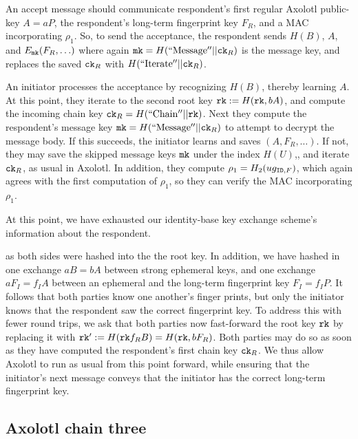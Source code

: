 \documentclass[twoside,letterpaper]{sig-alternate}
\begin{document}
An accept message should communicate 
 respondent's first regular Axolotl public-key $A = a P$,
 the respondent's long-term fingerprint key $F_R$, and
 a MAC incorporating $\rho_1$.
So, to send the acceptance, the respondent
sends $H(B)$, $A$, and $E_{\mathtt{mk}}(F_R,\ldots)$ where again
 $\mathtt{mk} = H(\mathrm{``Message''}  || \mathtt{ck}_R)$ is the message key,
and replaces the saved $\mathtt{ck}_R$ with $H(\mathrm{``Iterate''} || \mathtt{ck}_R)$.

\smallskip

An initiator processes the acceptance by recognizing $H(B)$,
 thereby learning $A$.
At this point, they iterate to the second root key
 $\mathtt{rk} := H(\mathtt{rk}, b A )$, and
compute the incoming chain key $\mathtt{ck}_R = H(\mathrm{``Chain''} || \mathtt{rk})$.
Next they compute the respondent's
 message key $\mathtt{mk} = H(\mathrm{``Message''}  || \mathtt{ck}_R)$
to attempt to decrypt the message body.
If this succeeds, the initiator learns and saves $(A,F_R,\ldots)$.
If not, they may save the skipped message keys $\mathtt{mk}$ under the index $H(U)$,,
and iterate $\mathtt{ck}_R$, as usual in Axolotl.
In addition, they compute $\rho_1 = H_2( u g_{\mathtt{ID},F} )$,
 which again agrees with the first computation of $\rho_1$,
so they can verify the MAC  incorporating $\rho_1$.

\smallskip







At this point, we have exhausted our identity-base key exchange scheme's
information about the respondent.  

 as both sides were hashed into the the root key.  In addition, we have
hashed in one exchange $a B = b A$ between strong ephemeral keys, and
one exchange $a F_I = f_I A$ between an ephemeral and
 the long-term fingerprint key $F_I = f_I P$.
It follows that both parties know one another's finger prints, but only
the initiator knows that the respondent saw the correct fingerprint key.
To address this with fewer round trips, we ask that both parties
now fast-forward the root key $\mathtt{rk}$ by replacing it with
 $\mathtt{rk}' := H(\mathtt{rk} f_R B) = H(\mathtt{rk}, b F_R )$.
Both parties may do so as soon as they have computed the respondent's
 first chain key $\mathtt{ck}_R$.
We thus allow Axolotl to run as usual from this point forward, while
ensuring that the initiator's next message conveys that the initiator
 has the correct long-term fingerprint key.

\subsection{Axolotl chain three}
\end{document}
